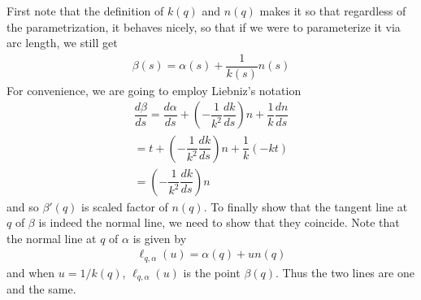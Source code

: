 \documentclass{article}
\begin{document}
	First note that the definition of $k(q)$ and $n(q)$ makes it so that regardless of the parametrization, it behaves nicely, so that if we were to parameterize it via arc length, we still get
	\begin{gather*}
		\beta(s) = \alpha(s) + \dfrac{1}{k(s)} n(s)
	\end{gather*}
	For convenience, we are going to employ Liebniz's notation
	\begin{gather*}
		\dfrac{d\beta}{ds} = \dfrac{d\alpha}{ds} + \left( - \dfrac{1}{k^2} \dfrac{dk}{ds} \right) n + \dfrac{1}{k} \dfrac{dn}{ds} \\
		= t + \left( - \dfrac{1}{k^2} \dfrac{dk}{ds} \right) n + \dfrac{1}{k} (-kt) \\
		= \left( - \dfrac{1}{k^2} \dfrac{dk}{ds} \right) n
	\end{gather*}
	and so $\beta'(q)$ is scaled factor of $n(q)$. To finally show that the tangent line at $q$ of $\beta$ is indeed the normal line, we need to show that they coincide. Note that the normal line at $q$ of $\alpha$ is given by
	\begin{gather*}
		\ell_{q,\alpha}(u) = \alpha(q) + un(q)
	\end{gather*}
	and when $u = 1/k(q)$, $\ell_{q,\alpha}(u)$ is the point $\beta(q)$. Thus the two lines are one and the same.
	
\end{document}
